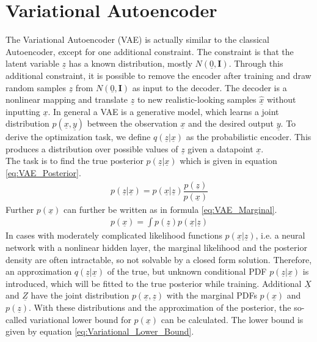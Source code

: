 \documentclass[12pt,DIV14,BCOR12mm,a4paper,footexclude,headinclude,halfparskip-,twoside,openright,cleardoubleempty,idxtotoc,bibtotoc,listtotoc]{scrreprt} %
\numberwithin{equation}{chapter}
\begin{document}
\section{Variational Autoencoder}
The Variational Autoencoder (VAE) is actually similar to the classical Autoencoder, except for one additional constraint. The constraint is that the latent variable $\underline{z}$ has a known distribution, mostly $N(\underline{0}, \mathbf{I})$. Through this additional constraint, it is possible to remove the encoder after training and draw random samples $\underline{z}$ from $N(\underline{0}, \mathbf{I})$ as input to the decoder. The decoder is a nonlinear mapping and translate $\underline{z}$ to new realistic-looking samples $\hat{\underline{x}}$ without inputting $\underline{x}$. In general a VAE is a generative model, which learns a joint distribution $p(\underline{x},\underline{y})$ between the observation $\underline{x}$ and the desired output $\underline{y}$. To derive the optimization task, we define $q(\underline{z}|\underline{x})$ as the probabilistic encoder. This produces a distribution over possible values of $\underline{z}$ given a datapoint $\underline{x}$.\\
The task is to find the true posterior $p(\underline{z}|\underline{x})$ which is given in equation \ref{eq:VAE_Posterior}.
\begin{align}
	 p(\underline{z}|\underline{x}) = p(\underline{x}|\underline{z})\dfrac{p(\underline{z})}{p(\underline{x})}\label{eq:VAE_Posterior}
\end{align}
Further $p(\underline{x})$ can further be written as in formula \ref{eq:VAE_Marginal}.
\begin{align}
	 p(\underline{x}) = \int p(\underline{z})p(\underline{x}|\underline{z})\label{eq:VAE_Marginal}
\end{align}
In cases with moderately complicated likelihood functions $p(\underline{x}|\underline{z})$, i.e. a neural network with a nonlinear hidden layer, the marginal likelihood and the posterior density are often intractable, so not solvable by a closed form solution. Therefore, an approximation $q(\underline{z}|\underline{x})$ of the true, but unknown conditional PDF $p(\underline{z}|\underline{x})$ is introduced, which will be fitted to the true posterior while training. Additional $\underline{X}$ and $\underline{Z}$ have the joint distribution $p(\underline{x},\underline{z})$ with the marginal PDFs $p(\underline{x})$ and $p(\underline{z})$. With these distributions and the approximation of the posterior, the so-called variational lower bound for $p(\underline{x})$ can be calculated. The lower bound is given by equation \ref{eq:Variational_Lower_Bound}.
\end{document}
